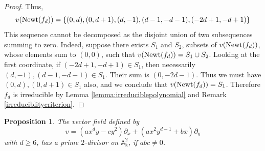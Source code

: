 \documentclass[reqno,oneside,11pt]{amsart}
\newtheorem{prop}[thm]{Proposition}
\theoremstyle{definition}
\DeclareMathOperator{\field}{k}
\begin{document}
\begin{proof}
Thus,
\[v({\rm Newt}(f_d)) = \{(0,d), (0,d+1), (d,-1), (d-1,-d-1), (-2d+1,-d+1)\}\]
This sequence cannot be decomposed as the disjoint union of two subsequences summing to zero. Indeed, suppose there exists $S_1$ and $S_2$, subsets of $v({\rm Newt}(f_d))$, whose elements sum to $(0,0)$, such that $v({\rm Newt}(f_d)) = S_1 \cup S_2$. Looking at the first coordinate, if $(-2d+1,-d+1) \in S_1$, then necessarily $(d,-1),(d-1,-d-1) \in S_1$. Their sum is $(0, -2d-1)$. Thus we must have $(0,d),(0,d+1) \in S_1$ also, and we conclude that $v({\rm Newt}(f_d)) = S_1$. Therefore $f_d$ is irreducible by Lemma \ref{lemma:irreduciblepolynomial} and Remark \ref{irreduciblitycriterion}.
\end{proof}

\begin{prop} \label{invIII} The vector field defined by
$$
    v = (ax^{d}y-cy^{2})\partial_{x}+(ax^{2}y^{d-1}+bx)\partial_{y}
$$
with $d \geq 6$, has a prime $2$-divisor on $\mathbb{A}^2_{\field}$, if $abc \neq 0$.
\end{prop}
\end{document}
